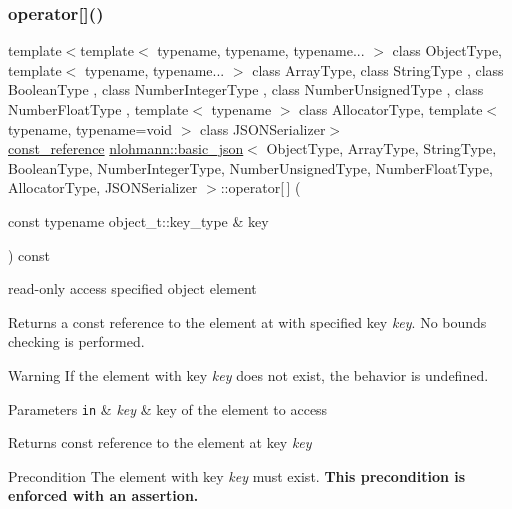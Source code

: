 \subsubsection{\texorpdfstring{operator[]()}{operator[]()}\hspace{0.1cm}{\footnotesize\ttfamily [4/8]}}
{\footnotesize\ttfamily template$<$template$<$ typename, typename, typename... $>$ class Object\+Type, template$<$ typename, typename... $>$ class Array\+Type, class String\+Type , class Boolean\+Type , class Number\+Integer\+Type , class Number\+Unsigned\+Type , class Number\+Float\+Type , template$<$ typename $>$ class Allocator\+Type, template$<$ typename, typename=void $>$ class J\+S\+O\+N\+Serializer$>$ \\
\hyperlink{classnlohmann_1_1basic__json_a4057c5425f4faacfe39a8046871786ca}{const\+\_\+reference} \hyperlink{classnlohmann_1_1basic__json}{nlohmann\+::basic\+\_\+json}$<$ Object\+Type, Array\+Type, String\+Type, Boolean\+Type, Number\+Integer\+Type, Number\+Unsigned\+Type, Number\+Float\+Type, Allocator\+Type, J\+S\+O\+N\+Serializer $>$\+::operator\mbox{[}$\,$\mbox{]} (\begin{DoxyParamCaption}\item[{const typename object\+\_\+t\+::key\+\_\+type \&}]{key }\end{DoxyParamCaption}) const\hspace{0.3cm}{\ttfamily [inline]}}



read-\/only access specified object element 

Returns a const reference to the element at with specified key {\itshape key}. No bounds checking is performed.

\begin{DoxyWarning}{Warning}
If the element with key {\itshape key} does not exist, the behavior is undefined.
\end{DoxyWarning}

\begin{DoxyParams}[1]{Parameters}
\mbox{\tt in}  & {\em key} & key of the element to access\\
\hline
\end{DoxyParams}
\begin{DoxyReturn}{Returns}
const reference to the element at key {\itshape key} 
\end{DoxyReturn}
\begin{DoxyPrecond}{Precondition}
The element with key {\itshape key} must exist. {\bfseries This precondition is enforced with an assertion.}
\end{DoxyPrecond}

